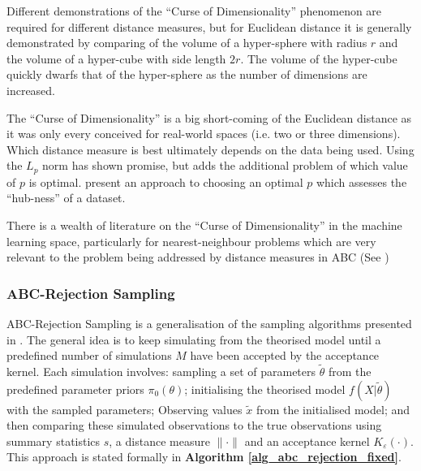 \documentclass[11pt,a4paper]{article}
\theoremstyle{break}
\begin{document}
  \par Different demonstrations of the ``Curse of Dimensionality'' phenomenon are required for different distance measures, but for Euclidean distance it is generally demonstrated by comparing of the volume of a hyper-sphere with radius $r$ and the volume of a hyper-cube with side length $2r$. The volume of the hyper-cube quickly dwarfs that of the hyper-sphere as the number of dimensions are increased.

  \par The ``Curse of Dimensionality'' is a big short-coming of the Euclidean distance as it was only every conceived for real-world spaces (i.e. two or three dimensions). Which distance measure is best ultimately depends on the data being used. Using the $L_p$ norm has shown promise, but adds the additional problem of which value of $p$ is optimal. \cite[]{choosing_the_metric_in_high_dimensional_spaces_based_on_hub_analysis} present an approach to choosing an optimal $p$ which assesses the ``hub-ness'' of a dataset.

  \par There is a wealth of literature on the ``Curse of Dimensionality'' in the machine learning space, particularly for nearest-neighbour problems which are very relevant to the problem being addressed by distance measures in ABC (See \cite[]{when_is_nearest_neighbour_meaningful,what_is_the_nearest_neigbour_in_high_dimensional_space,hubs_in_space})

\subsubsection{ABC-Rejection Sampling}\label{sec_abc_rejection_sampling}

  ABC-Rejection Sampling is a generalisation of the sampling algorithms presented in \cite[]{inferring_coalescence_times_from_dna_sequence_data,population_growth_of_human_Y_chromosomes}. The general idea is to keep simulating from the theorised model until a predefined number of simulations $M$ have been accepted by the acceptance kernel. Each simulation involves: sampling a set of parameters $\tilde\theta$ from the predefined parameter priors $\pi_0(\theta)$; initialising the theorised model $f(X|\tilde\theta)$ with the sampled parameters; Observing values $\tilde{x}$ from the initialised model; and then comparing these simulated observations to the true observations using summary statistics $s$, a distance measure $\|\cdot\|$ and an acceptance kernel $K_\varepsilon(\cdot)$. This approach is stated formally in \textbf{Algorithm \ref{alg_abc_rejection_fixed}}.
\end{document}
